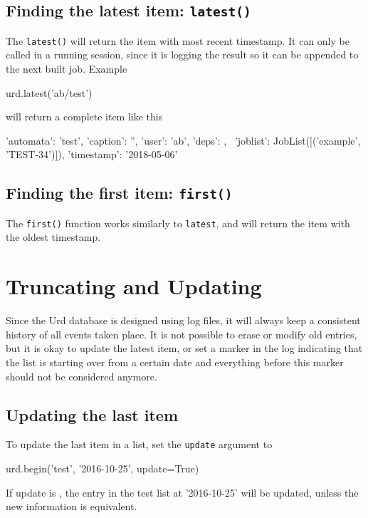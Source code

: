 
\subsection{Finding the latest item:  \texttt{latest()}}
The \texttt{latest()} will return the item with most recent timestamp.
It can only be called in a running session, since it is logging the
result so it can be appended to the next built job.  Example
\begin{python}
urd.latest('ab/test')
\end{python}
will return a complete item like this
\begin{shell}
{'automata': 'test', 'caption': '', 'user': 'ab', 'deps': {}, \
 'joblist': JobList([('example', 'TEST-34')]), 'timestamp': '2018-05-06'}
\end{shell}


\subsection{Finding the first item:  \texttt{first()}}
The \texttt{first()} function works similarly to \texttt{latest}, and
will return the item with the oldest timestamp.



\section{Truncating and Updating}
\label{sec:trunc-update}
Since the Urd database is designed using log files, it will always
keep a consistent history of all events taken place.  It is not
possible to erase or modify old entries, but it is okay to update the
latest item, or set a marker in the log indicating that the list is
starting over from a certain date and everything before this marker
should not be considered anymore.



\subsection{Updating the last item}
To update the last item in a list, set the \texttt{update} argument
to \pyTrue
\begin{python}
urd.begin('test', '2016-10-25', update=True)
\end{python}
If update is \pyTrue, the entry in the test list at '2016-10-25' will
be updated, unless the new information is equivalent.

